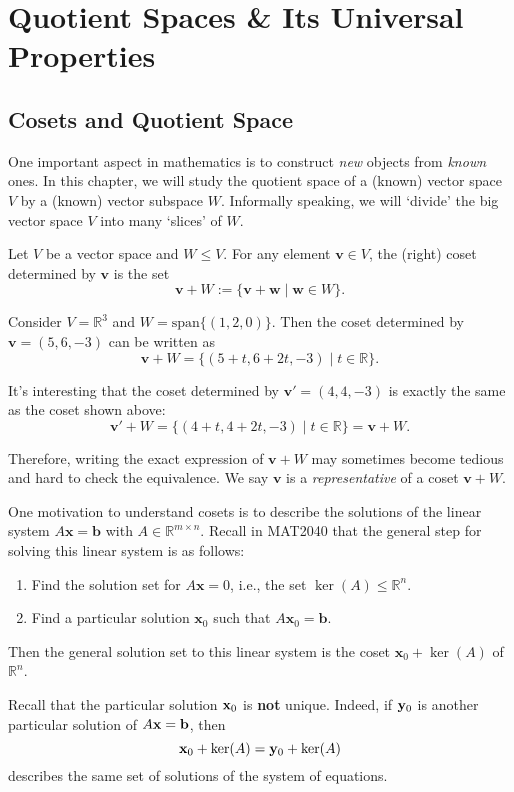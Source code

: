 \chapter{Quotient Spaces \& Its Universal Properties}

\section{Cosets and Quotient Space}
One important aspect in mathematics is to construct {\it new} objects from {\it known} ones. In this chapter, we will study the quotient space of a (known) vector space $V$ by a (known) vector subspace $W$. Informally speaking, we will `divide' the big vector space $V$ into many `slices' of $W$.


\begin{definition}[Coset]
Let \( V \) be a vector space and \( W \leq V \). For any element \( \mathbf{v} \in V \), the (right) coset determined by \( \mathbf{v} \) is the set
\[
\mathbf{v} + W := \{ \mathbf{v} + \mathbf{w} \mid \mathbf{w} \in W \}.
\]
\end{definition}

\begin{example}
Consider \( V = \mathbb{R}^3 \) and \( W = \mathrm{span}\{(1,2,0)\} \). Then the coset determined by \( \mathbf{v} = (5,6,-3) \) can be written as
\[
\mathbf{v} + W = \{ (5 + t, 6 + 2t, -3) \mid t \in \mathbb{R} \}.
\]

It’s interesting that the coset determined by \( \mathbf{v}' = (4,4,-3) \) is exactly the same as the coset shown above:
\[
\mathbf{v}' + W = \{ (4 + t, 4 + 2t, -3) \mid t \in \mathbb{R} \} = \mathbf{v} + W.
\]

Therefore, writing the exact expression of \( \mathbf{v} + W \) may sometimes become tedious and hard to check the equivalence. We say \( \mathbf{v} \) is a \emph{representative} of a coset \( \mathbf{v} + W \). 
\end{example}

\begin{example}
One motivation to understand cosets is to describe the solutions of the linear system \( A \mathbf{x} = \mathbf{b} \) with \( A \in \mathbb{R}^{m \times n} \). 
Recall in MAT2040 that the general step for solving this linear system is as follows:
\begin{enumerate}
    \item Find the solution set for \( A \mathbf{x} = 0 \), i.e., the set \( \ker(A) \leq \mathbb{R}^n\).
    \item Find a particular solution \( \mathbf{x}_0 \) such that \( A \mathbf{x}_0 = \mathbf{b} \).
\end{enumerate}
\noindent Then the general solution set to this linear system is the coset 
$\mathbf{x}_0 + \ker(A)$
of $\mathbb{R}^n$.

Recall that the particular solution ${\bf x}_0$ is {\bf not} unique. Indeed, if ${\bf y}_0$ is another particular solution of $A{\bf x} = {\bf b}$, then 
$${\bf x}_0 + \ker(A) = {\bf y}_0 + \ker(A)$$
describes the same set of solutions of the system of equations.
\end{example}

